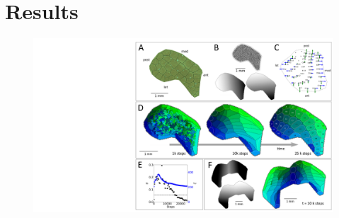 \documentclass[9pt,twocolumn,twoside,lineno]{pnas-new}
\begin{document}
\section*{Results}

\begin{figure}
\begin{center}
\includegraphics[width=\textwidth]{../briefpaper/MainFig.png}
\end{center}


\end{figure}
\end{document}
